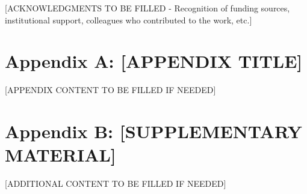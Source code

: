 \documentclass[11pt,a4paper]{article}
\begin{document}
	[ACKNOWLEDGMENTS TO BE FILLED - Recognition of funding sources, institutional support, colleagues who contributed to the work, etc.]
	
	\newpage
	
	\printbibliography[title=References]
	
	\newpage
	
	\appendix
	
	\section{Appendix A: [APPENDIX TITLE]}
	
	[APPENDIX CONTENT TO BE FILLED IF NEEDED]
	
	\section{Appendix B: [SUPPLEMENTARY MATERIAL]}
	
	[ADDITIONAL CONTENT TO BE FILLED IF NEEDED]
	
\end{document}
